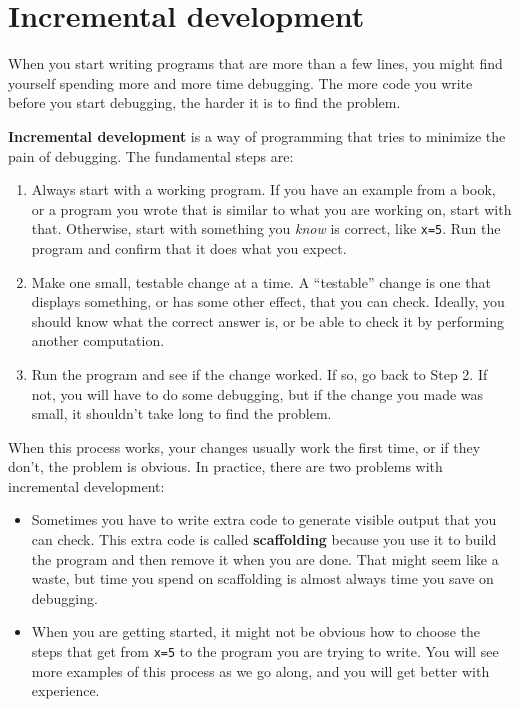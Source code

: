 \documentclass[12pt]{book}
\theoremstyle{exercise}
\begin{document}
\section{Incremental development}

When you start writing programs that are more than a few lines, you
might find yourself spending more and more time debugging.  The more
code you write before you start debugging, the harder it is to find
the problem.

{\bf Incremental development} is a way of programming that tries
to minimize the pain of debugging.  The fundamental steps are:

\begin{enumerate}

\item Always start with a working program.  If you have an
example from a book, or a program you wrote that is similar to
what you are working on, start with that.  Otherwise, start with
something you {\em know} is correct, like {\tt x=5}.  Run the program
and confirm that it does what you expect.

\item Make one small, testable change at a time.  A ``testable''
change is one that displays something, or has some
other effect, that you can check.  Ideally, you should know what
the correct answer is, or be able to check it by performing another
computation. 

\item Run the program and see if the change worked.  If so, go back
to Step 2.  If not, you will have to do some debugging, but if the
change you made was small, it shouldn't take long to find the problem.

\end{enumerate}

When this process works, your changes usually work the first time, or if they don't, the problem is obvious.  In practice, there are two problems with incremental development:

\begin{itemize}

\item Sometimes you have to write extra code to generate visible output that you can check.  This extra code is called {\bf scaffolding} because you use it to build the program and then remove it when you are done.  That might seem like a waste, but time you spend on scaffolding is almost always time you save on debugging.

\item When you are getting started, it might not be obvious how to
choose the steps that get from {\tt x=5} to the program you are trying
to write.  You will see more examples of this process as we go along, and you will get better with experience.

\end{itemize}
\end{document}
